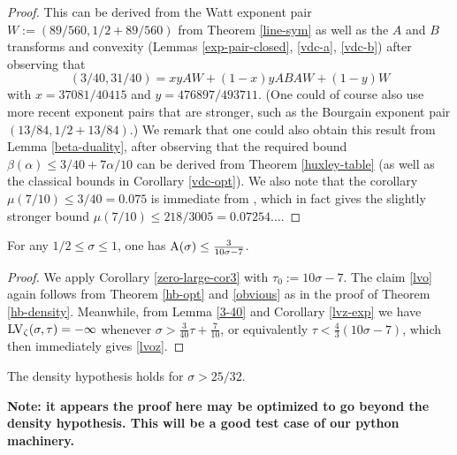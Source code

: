 \begin{proof}  This can be derived from the Watt exponent pair $W := (89/560, 1/2 + 89/560)$ from Theorem \ref{line-sym} as well as the $A$ and $B$ transforms and convexity (Lemmas \ref{exp-pair-closed}, \ref{vdc-a}, \ref{vdc-b}) after observing that
$$(3/40,31/40) = xy AW + (1-x)y ABA W + (1-y) W$$
with $x=37081/40415$ and $y=476897/493711$.  (One could of course also use more recent exponent pairs that are stronger, such as the Bourgain exponent pair $(13/84, 1/2+13/84)$.)  We remark that one could also obtain this result from Lemma \ref{beta-duality}, after observing that the required bound $\beta(\alpha) \leq 3/40 + 7\alpha/10$ can be derived from Theorem \ref{huxley-table} (as well as the classical bounds in Corollary \ref{vdc-opt}).  We also note that the corollary $\mu(7/10) \leq 3/40 = 0.075$ is immediate from \cite[Theorem 2.4]{trudgian-yang}, which in fact gives the slightly stronger bound $\mu(7/10) \leq 218/3005 = 0.07254\dots$.
\end{proof}

\begin{theorem}\label{hb-density2} For any $1/2 \leq \sigma \leq 1$, one has $\mathrm{A}(\sigma) \leq \frac{3}{10\sigma-7}$.
\end{theorem}
\derived
{}

\begin{proof}  We apply Corollary \ref{zero-large-cor3} with $\tau_0 := 10\sigma-7$.  The claim \eqref{lvo} again follows from
    Theorem \ref{hb-opt} and \eqref{obvious} as in the proof of Theorem \ref{hb-density}.  Meanwhile, from Lemma \ref{3-40} and Corollary \ref{lvz-exp} we have $\mathrm{LV}_\zeta(\sigma,\tau) = -\infty$ whenever $\sigma > \frac{3}{40} \tau + \frac{7}{10}$, or equivalently $\tau < \frac{4}{3} (10\sigma-7)$, which then immediately gives \eqref{lvoz}.
\end{proof}

\begin{theorem}\label{bourgain-density} The density hypothesis holds for $\sigma > 25/32$.
\end{theorem}

{\bf Note: it appears the proof here may be optimized to go beyond the density hypothesis.  This will be a good test case of our python machinery.}

